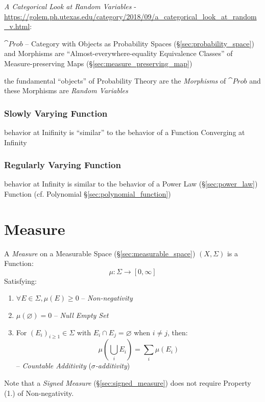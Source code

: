 \emph{A Categorical Look at Random Variables} -
\url{https://golem.ph.utexas.edu/category/2018/09/a_categorical_look_at_random_v.html}:

$\cat{Prob}$ -- Category with Objects as Probability Spaces
(\S\ref{sec:probability_space}) and Morphisms are ``Almost-everywhere-equality
Equivalence Classes'' of Measure-preserving Maps
(\S\ref{sec:measure_preserving_map})

the fundamental ``objects'' of Probability Theory are the \emph{Morphisms} of
$\cat{Prob}$ and these Morphisms are \emph{Random Variables}



\subsubsection{Slowly Varying Function}\label{sec:slowly_varying}

behavior at Inifinity is ``similar'' to the behavior of a Function Converging at
Infinity



\subsubsection{Regularly Varying Function}\label{sec:regularly_varying}

behavior at Infinity is similar to the behavior of a Power Law
(\S\ref{sec:power_law}) Function (cf. Polynomial
\S\ref{sec:polynomial_function})



\section{Measure}\label{sec:measure}

A \emph{Measure} on a Measurable Space (\S\ref{sec:measurable_space})
$(X,\Sigma)$ is a Function:
\[
  \mu : \Sigma \rightarrow [0,\infty]
\]
Satisfying:
\begin{enumerate}
  \item $\forall E \in \Sigma, \mu(E) \geq 0$ -- \emph{Non-negativity}
  \item $\mu(\varnothing) = 0$ -- \emph{Null Empty Set}
  \item For $(E_i)_{i \geq 1} \in \Sigma$ with $E_i \cap E_j = \varnothing$
    when $i \neq j$, then:
    \[
      \mu (\bigcup_i E_i) = \sum_i \mu(E_i)
    \]
    -- \emph{Countable Additivity} (\emph{$\sigma$-additivity})
\end{enumerate}
Note that a \emph{Signed Measure} (\S\ref{sec:signed_measure}) does not require
Property (1.) of Non-negativity.

